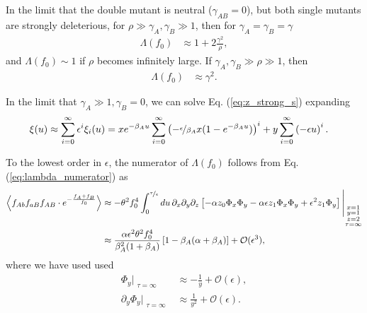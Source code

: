 \documentclass[11pt]{article}
\begin{document}
In the limit that the double mutant is neutral ($\gamma_{AB} = 0 $), but both single mutants are strongly deleterious, for $\rho \gg \gamma_A, \gamma_B \gg 1$, then for $\gamma_A = \gamma_B = \gamma$
\begin{align}
    \Lambda(f_0) &\approx 1 + 2\frac{\gamma^2}{\rho},
\end{align} 
and $\Lambda(f_0) \sim 1$ if $\rho$ becomes infinitely large. If $\gamma_A, \gamma_B \gg \rho \gg1$, then 
\begin{align}
    \Lambda(f_0) &\approx \gamma^2.
\end{align} 

In the limit that $\gamma_A \gg 1,\gamma_B =0$, we can solve Eq. (\ref{eq:z_strong_s}) expanding
\begin{align}
    \xi (u) &\approx \sum_{i=0}^\infty \epsilon^i \xi_i (u) = xe^{-\beta_A u} \sum_{i=0}^\infty \left(-\nicefrac{\epsilon}{\beta_A}x(1-e^{-\beta_A u})\right)^i
    + y \sum_{i=0}^\infty \left(-\epsilon u\right)^i
    .\label{eq:f(u)_series}
\end{align}

To the lowest order in $\epsilon$, the numerator of $\Lambda(f_0)$ follows from Eq. (\ref{eq:lambda_numerator}) as
\begin{align}\label{eq:lambda_num_large_rho}
    \left\langle f_{Ab}f_{aB}f_{AB}\cdot e^{-\frac{f_{A}+f_{B}}{f_0}}\right\rangle
 &\approx -\theta^2 f_0^4 \int_0^{\nicefrac{\tau}{\epsilon}} du\, \partial_x\partial_y\partial_z \left[-\alpha z_0\Phi_x\Phi_y -\alpha \epsilon z_1 \Phi_x\Phi_y + \epsilon^2 z_1\Phi_y \right]\Bigg\vert_{\substack{x=1 \\ y=1 \\ z=2 \\ \tau=\infty}} \\ \nonumber
 &\approx \frac{\alpha \epsilon^2 \theta^2 f_0^4}{\beta_A^2 (1+\beta_A)} \left[1 - \beta_A(\alpha+\beta_A) \right]+ \mathcal{O}(\epsilon^3),
\end{align}
where we have used used
\begin{subequations}\begin{align}
    \Phi_y \Big\vert_{\substack{\tau=\infty}} &\approx - \frac{1}{y} + \mathcal{O}(\epsilon)
    , \\
    \partial_y \Phi_y \Big\vert_{\substack{\tau=\infty}} &\approx \frac{1}{y^2} +\mathcal{O}(\epsilon).
\end{align}\end{subequations}
\end{document}
